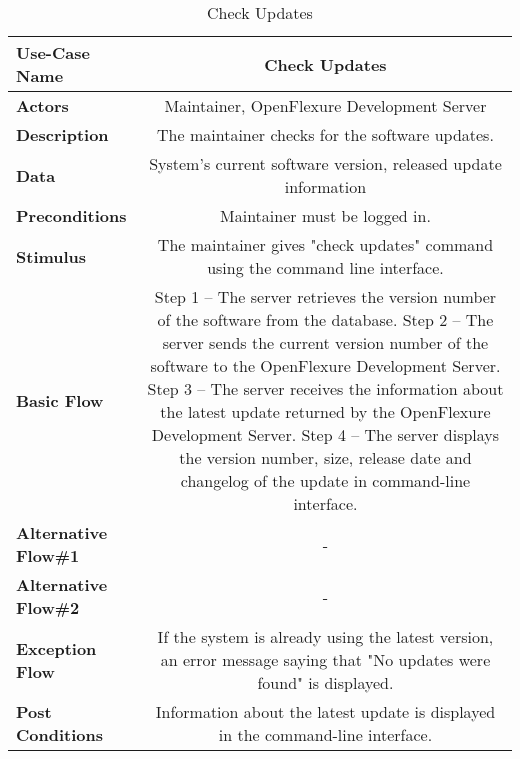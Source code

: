 \begin{table}[H]
     \centering
     \begin{tabular}{|l|C|}
         \hline
          \textbf{Use-Case Name} & Check Updates \\
         \hline
          \textbf{Actors} & Maintainer, OpenFlexure Development Server \\ 
         \hline
          \textbf{Description} & The maintainer checks for the software updates.\\ 
         \hline
          \textbf{Data} & System's current software version, released update information\\
         \hline
          \textbf{Preconditions} & 
          Maintainer must be logged in. \\
         \hline
          \textbf{Stimulus} & The maintainer gives "check updates" command using the command line interface.\\ 
         \hline
          \textbf{Basic Flow} & 
          Step 1 -- The server retrieves the version number of the software from the database. \newline
          Step 2 -- The server sends the current version number of the software to the OpenFlexure Development Server. \newline
          Step 3 -- The server receives the information about the latest update returned by the OpenFlexure Development Server. \newline
          Step 4 -- The server displays the version number, size, release date and changelog of the update in command-line interface. \\
         \hline
          \textbf{Alternative Flow\#1} & - \\
         \hline
          \textbf{Alternative Flow\#2} & - \\
         \hline
          \textbf{Exception Flow} & If the system is already using the latest version, an error message saying that "No updates were found" is displayed. \\
         \hline
          \textbf{Post Conditions} & Information about the latest update is displayed in the command-line interface. \\ 
         \hline
     \end{tabular}
     \caption{Check Updates}
     \label{tab:check_updates}
 \end{table}